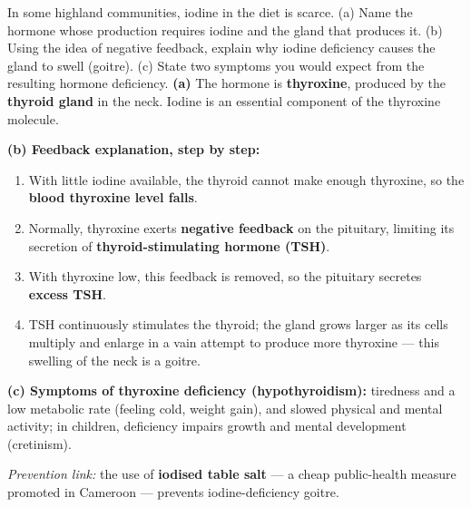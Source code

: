 \documentclass[11pt]{article}
\newcommand{\cle}[1]{{\popxbold\color{popdark}#1}}
\begin{document}
\begin{exoresolu}
In some highland communities, iodine in the diet is scarce. (a) Name the hormone whose production requires iodine and the gland that produces it. (b) Using the idea of negative feedback, explain why iodine deficiency causes the gland to swell (goitre). (c) State two symptoms you would expect from the resulting hormone deficiency.
\tcblower
\textbf{(a)} The hormone is \textbf{thyroxine}, produced by the \textbf{thyroid gland} in the neck. Iodine is an essential component of the thyroxine molecule.

\textbf{(b) Feedback explanation, step by step:}
\begin{enumerate}
\item With little iodine available, the thyroid cannot make enough thyroxine, so the \textbf{blood thyroxine level falls}.
\item Normally, thyroxine exerts \textbf{negative feedback} on the pituitary, limiting its secretion of \textbf{thyroid-stimulating hormone (TSH)}.
\item With thyroxine low, this feedback is removed, so the pituitary secretes \textbf{excess TSH}.
\item TSH continuously stimulates the thyroid; the gland grows larger as its cells multiply and enlarge in a vain attempt to produce more thyroxine — this swelling of the neck is a \cle{goitre}.
\end{enumerate}

\textbf{(c) Symptoms of thyroxine deficiency (hypothyroidism):} tiredness and a low metabolic rate (feeling cold, weight gain), and slowed physical and mental activity; in children, deficiency impairs growth and mental development (cretinism).

\emph{Prevention link:} the use of \textbf{iodised table salt} — a cheap public-health measure promoted in Cameroon — prevents iodine-deficiency goitre.
\end{exoresolu}
\end{document}
